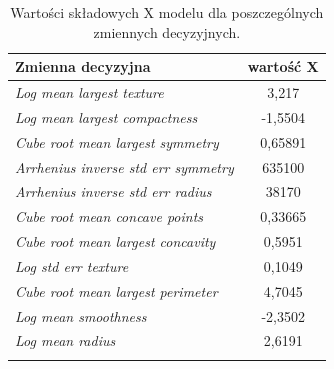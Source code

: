\begin{longtable}{l | c}
	\centering
	Zmienna decyzyjna & wartość X \\
	\hline
	\textit{Log mean largest texture} & 3,217 \\
	\textit{Log mean largest compactness} & -1,5504 \\
	\textit{Cube root mean largest symmetry} & 0,65891 \\
	\textit{Arrhenius inverse std err symmetry} & 635100 \\
	\textit{Arrhenius inverse std err radius} & 38170 \\
	\textit{Cube root mean concave points} & 0,33665 \\
	\textit{Cube root mean largest concavity} & 0,5951 \\
	\textit{Log std err texture} & 0,1049 \\
	\textit{Cube root mean largest perimeter} & 4,7045 \\
	\textit{Log mean smoothness} & -2,3502 \\
	\textit{Log mean radius} & 2,6191 \\
	\caption{Wartości składowych X modelu dla poszczególnych zmiennych decyzyjnych.}
	\label{svm:1}
\end{longtable} 

